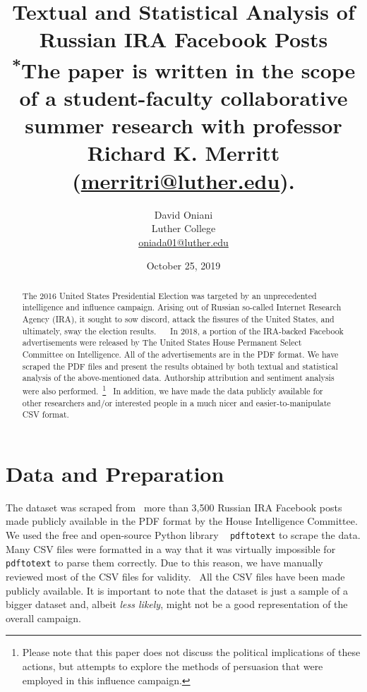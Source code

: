 \documentclass[11pt]{article}
\author{David Oniani\\
        Luther College\\
        \href{mailto:oniada01@luther.edu}{oniada01@luther.edu}}
\title{\textbf{Textual and Statistical Analysis of Russian IRA Facebook Posts}\\
       \medskip
       \small \textsuperscript{*}The paper is written in the scope of a
       student-faculty collaborative\\ summer research with professor Richard
       K. Merritt (\href{mailto:merritri@luther.edu}{merritri@luther.edu}).}
\date{October 25, 2019}
\begin{document}
\maketitle


\begin{abstract}

\noindent The 2016 United States Presidential Election was targeted by an
unprecedented intelligence and influence campaign. Arising out of Russian
so-called Internet Research Agency (IRA), it sought to sow discord, attack
the fissures of the United States, and ultimately, sway the election results.
~\cite{ira2016}~\cite{ira2016data} In 2018, a portion of the IRA-backed
Facebook advertisements were released by The United States House Permanent
Select Committee on Intelligence. All of the advertisements are in the PDF
format. We have scraped the PDF files and present the results obtained by both
textual and statistical analysis of the above-mentioned data. Authorship
attribution and sentiment analysis were also performed.~\footnote{Please note
that this paper does not discuss the political implications of these actions,
but attempts to explore the methods of persuasion that were employed in this
influence campaign.}~\cite{ira2016csvdata} In addition, we have made the data
publicly available for other researchers and/or interested people in a much
nicer and easier-to-manipulate CSV format.
\end{abstract}


\newpage
\tableofcontents
\newpage


\section*{\centering Data and Preparation}

The dataset was scraped from~\cite{ira2016data} more than 3,500 Russian IRA
Facebook posts made publicly available in the PDF format by the House
Intelligence Committee. We used the free and open-source Python library
~\cite{pdftotext} \texttt{pdftotext} to scrape the data. Many CSV files were
formatted in a way that it was virtually impossible for \texttt{pdftotext} to
parse them correctly. Due to this reason, we have manually reviewed most of the
CSV files for validity.~\cite{ira2016csvdata} All the CSV files have been made
publicly available. It is important to note that the dataset is just a sample
of a bigger dataset and, albeit \textit{less likely}, might not be a good
representation of the overall campaign.
\end{document}
